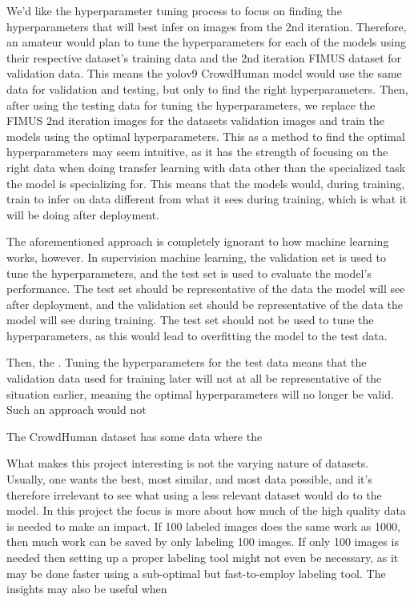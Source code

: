 We'd like the hyperparameter tuning process to focus on finding the hyperparameters that will best infer on images from the 2nd iteration. Therefore, an amateur would plan to tune the hyperparameters for each of the models using their respective dataset's training data and the 2nd iteration FIMUS dataset for validation data. This means the yolov9 CrowdHuman model would use the same data for validation and testing, but only to find the right hyperparameters. Then, after using the testing data for tuning the hyperparameters, we replace the FIMUS 2nd iteration images for the datasets validation images and train the models using the optimal hyperparameters. This as a method to find the optimal hyperparameters may seem intuitive, as it has the strength of focusing on the right data when doing transfer learning with data other than the specialized task the model is specializing for. This means that the models would, during training, train to infer on data different from what it sees during training, which is what it will be doing after deployment.

The aforementioned approach is completely ignorant to how machine learning works, however. In supervision machine learning, the validation set is used to tune the hyperparameters, and the test set is used to evaluate the model's performance. The test set should be representative of the data the model will see after deployment, and the validation set should be representative of the data the model will see during training. The test set should not be used to tune the hyperparameters, as this would lead to overfitting the model to the test data.

Then, the . Tuning the hyperparameters for the test data means that the validation data used for training later will not at all be representative of the situation earlier, meaning the optimal hyperparameters will no longer be valid. Such an approach would not 


The CrowdHuman dataset has some data where the 


What makes this project interesting is not the varying nature of datasets. Usually, one wants the best, most similar, and most data possible, and it's therefore irrelevant to see what using a less relevant dataset would do to the model. In this project the focus is more about how much of the high quality data is needed to make an impact. If 100 labeled images does the same work as 1000, then much work can be saved by only labeling 100 images. If only 100 images is needed then setting up a proper labeling tool might not even be necessary, as it may be done faster using a sub-optimal but fast-to-employ labeling tool. The insights may also be useful when 

